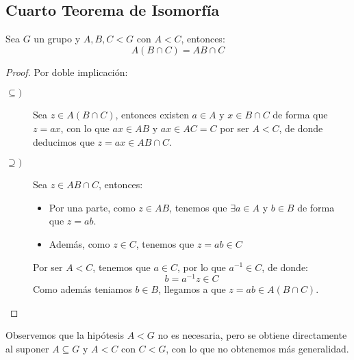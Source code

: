\subsection{Cuarto Teorema de Isomorfía}
\begin{lema}
    Sea $G$ un grupo y $A,B,C < G$ con $A<C$, entonces:
    \begin{equation*}
        A(B\cap C) = AB \cap C
    \end{equation*}
    \begin{proof}
        Por doble implicación:
        \begin{description}
            \item [$\subseteq)$] Sea $z\in A(B\cap C)$, entonces existen $a\in A$ y $x\in B\cap C$ de forma que $z=ax$, con lo que $ax\in AB$ y $ax\in AC = C$ por ser $A<C$, de donde deducimos que $z = ax \in AB\cap C$.
            \item [$\supseteq)$] Sea $z\in AB\cap C$, entonces:
                \begin{itemize}
                    \item Por una parte, como $z\in AB$, tenemos que $\exists a\in A$ y $b\in B$ de forma que $z=ab$.
                    \item Además, como $z\in C$, tenemos que $z = ab \in C$
                \end{itemize}
                Por ser $A<C$, tenemos que $a\in C$, por lo que $a^{-1}\in C$, de donde:
                \begin{equation*}
                    b = a^{-1}z \in C
                \end{equation*}
                Como además teniamos $b\in B$, llegamos a que $z=ab \in A(B\cap C)$.
        \end{description}
    \end{proof}
\end{lema}

\begin{observacion}
    Observemos que la hipótesis $A<G$ no es necesaria, pero se obtiene directamente al suponer $A\subseteq G$ y $A<C$ con $C<G$, con lo que no obtenemos más generalidad.
\end{observacion}

